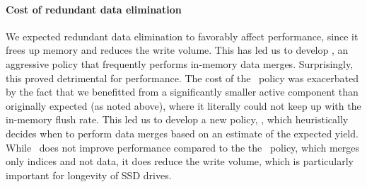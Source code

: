 \paragraph{Cost of redundant data elimination}
We expected redundant data elimination to favorably affect performance, since it frees up memory and reduces the write volume.
This has led us to develop \eager, an aggressive policy that frequently performs in-memory data merges. 
Surprisingly, this proved detrimental for performance. The cost of the \eager\ policy was exacerbated by the 
fact that we benefitted from a significantly smaller active component than originally expected (as noted above),  
where it literally could not keep up with the in-memory flush rate. 
This led us to develop a new policy, \adp, which heuristically decides when to perform data merges based on 
an estimate of the expected yield. 
While \adp\ does not improve performance compared to the the \basic\ policy, which merges only indices and not data,
it does reduce the write volume, which is particularly important for longevity of SSD drives.


